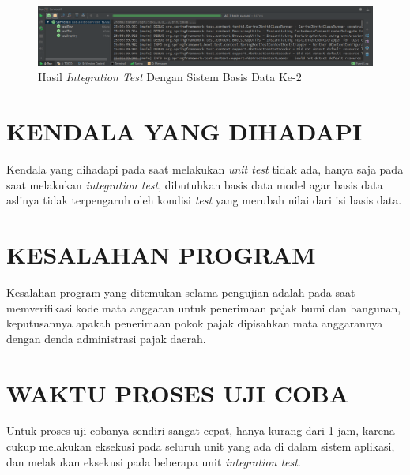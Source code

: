 \documentclass[pdftex,12pt, oneside]{article}
\begin{document}
\begin{enumerate}[A.]
\begin{enumerate}[1.]
    \begin{figure}[H]
      \centering
      \includegraphics[width=1\textwidth]{./resources/08-services-it-2}
      \caption{Hasil \textit{Integration Test} Dengan Sistem Basis Data Ke-2}
      \label{fig:services-it-success}
    \end{figure}
    
  \end{enumerate}
\end{enumerate}


\section{KENDALA YANG DIHADAPI}

Kendala yang dihadapi pada saat melakukan \textit{unit test} tidak ada, hanya saja pada saat melakukan \textit{integration test}, dibutuhkan basis data model agar basis data aslinya tidak terpengaruh oleh kondisi \textit{test} yang merubah nilai dari isi basis data.


\section{KESALAHAN PROGRAM}

Kesalahan program yang ditemukan selama pengujian adalah pada saat memverifikasi kode mata anggaran untuk penerimaan pajak bumi dan bangunan, keputusannya apakah penerimaan pokok pajak dipisahkan mata anggarannya dengan denda administrasi pajak daerah.


\section{WAKTU PROSES UJI COBA}

Untuk proses uji cobanya sendiri sangat cepat, hanya kurang dari 1 jam, karena cukup melakukan eksekusi pada seluruh unit yang ada di dalam sistem aplikasi, dan melakukan eksekusi pada beberapa unit \textit{integration test}.
\end{document}
